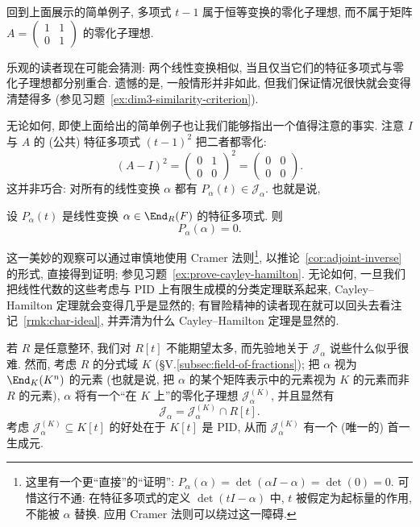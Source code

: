 回到上面展示的简单例子, 多项式 $t-1$ 属于恒等变换的零化子理想, 而不属于矩阵 $A=\begin{pmatrix}1&1\\0&1\end{pmatrix}$ 的零化子理想.

乐观的读者现在可能会猜测: 两个线性变换相似, 当且仅当它们的特征多项式与零化子理想都分别重合. 遗憾的是, 一般情形并非如此, 但我们保证情况很快就会变得清楚得多 (参见习题~\ref{ex:dim3-similarity-criterion}).

无论如何, 即使上面给出的简单例子也让我们能够指出一个值得注意的事实. 注意 $I$ 与 $A$ 的 (公共) 特征多项式 $(t-1)^2$ 把二者都零化:
\[
(A-I)^2=\begin{pmatrix}0&1\\0&0\end{pmatrix}^2=\begin{pmatrix}0&0\\0&0\end{pmatrix}.
\]
这并非巧合: 对所有的线性变换 $\alpha$ 都有 $P_\alpha(t)\in\mathcal{J}_\alpha$. 也就是说,

\begin{theorem}\label{thm:cayley-hamilton}
设 $P_\alpha(t)$ 是线性变换 $\alpha\in\End_R(F)$ 的特征多项式. 则
\[
P_\alpha(\alpha)=0.
\]
\end{theorem}

这一美妙的观察可以通过审慎地使用 Cramer 法则\footnote{这里有一个更``直接''的``证明'': $P_\alpha(\alpha)=\det(\alpha I-\alpha)=\det(0)=0$. 可惜这行不通: 在特征多项式的定义 $\det(tI-\alpha)$ 中, $t$ 被假定为起标量的作用, 不能被 $\alpha$ 替换. 应用 Cramer 法则可以绕过这一障碍.}, 以推论~\ref{cor:adjoint-inverse} 的形式, 直接得到证明; 参见习题~\ref{ex:prove-cayley-hamilton}. 无论如何, 一旦我们把线性代数的这些考虑与 PID 上有限生成模的分类定理联系起来, Cayley--Hamilton 定理就会变得几乎是显然的; 有冒险精神的读者现在就可以回头去看注记~\ref{rmk:char-ideal}, 并弄清为什么 Cayley--Hamilton 定理是显然的.

若 $R$ 是任意整环, 我们对 $R[t]$ 不能期望太多, 而先验地关于 $\mathcal{J}_\alpha$ 说些什么似乎很难. 然而, 考虑 $R$ 的分式域 $K$ (§V.\ref{subsec:field-of-fractions}); 把 $\alpha$ 视为 $\End_K(K^n)$ 的元素 (也就是说, 把 $\alpha$ 的某个矩阵表示中的元素视为 $K$ 的元素而非 $R$ 的元素), $\alpha$ 将有一个``在 $K$ 上''的零化子理想 $\mathcal{J}_\alpha^{(K)}$, 并且显然有
\[
\mathcal{J}_\alpha=\mathcal{J}_\alpha^{(K)}\cap R[t].
\]
考虑 $\mathcal{J}_\alpha^{(K)}\subseteq K[t]$ 的好处在于 $K[t]$ 是 PID, 从而 $\mathcal{J}_\alpha^{(K)}$ 有一个 (唯一的) 首一生成元.

